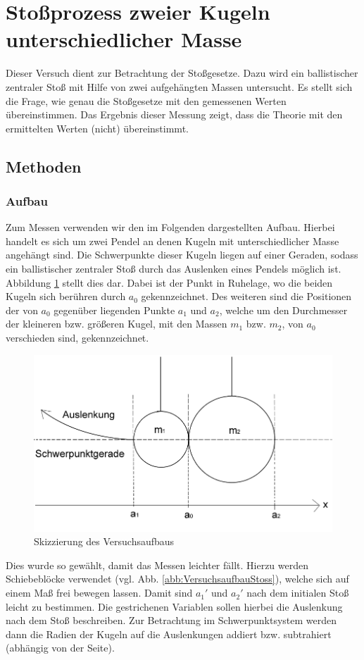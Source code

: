 \section{Stoßprozess zweier Kugeln unterschiedlicher Masse}
	
	Dieser Versuch dient zur Betrachtung der Stoßgesetze. Dazu wird ein ballistischer zentraler Stoß mit Hilfe von zwei aufgehängten Massen untersucht. Es stellt sich die Frage, wie genau die Stoßgesetze mit den gemessenen Werten übereinstimmen. Das Ergebnis dieser Messung zeigt, dass die Theorie mit den ermittelten Werten (nicht) übereinstimmt. %
	
	\subsection{Methoden}
		
		\subsubsection{Aufbau}
			
		Zum Messen verwenden wir den im Folgenden dargestellten Aufbau. Hierbei handelt es sich um zwei Pendel an denen Kugeln mit unterschiedlicher Masse angehängt sind. Die Schwerpunkte dieser Kugeln liegen auf einer Geraden, sodass ein ballistischer zentraler Stoß durch das Auslenken eines Pendels möglich ist. Abbildung \ref{abb:VersuchsskizzeStoss} stellt dies dar. Dabei ist der Punkt in Ruhelage, wo die beiden Kugeln sich berühren durch $a_0$ gekennzeichnet. Des weiteren sind die Positionen der von $a_0$ gegenüber liegenden Punkte $a_1$ und $a_2$, welche um den Durchmesser der kleineren bzw. größeren Kugel, mit den Massen $m_1$ bzw. $m_2$, von $a_0$ verschieden sind, gekennzeichnet.
		\begin{figure}[ht]
			\centering
			\includegraphics[width=\textwidth]{Kugelstoss.png}
			\caption{Skizzierung des Versuchsaufbaus}
			\label{abb:VersuchsskizzeStoss}	
		\end{figure}
		Dies wurde so gewählt, damit das Messen leichter fällt. Hierzu werden Schiebeblöcke verwendet (vgl. Abb. \ref{abb:VersuchsaufbauStoss}), welche sich auf einem Maß frei bewegen lassen. Damit sind $a_1'$ und $a_2'$ nach dem initialen Stoß leicht zu bestimmen. Die gestrichenen Variablen sollen hierbei die Auslenkung nach dem Stoß beschreiben. Zur Betrachtung im Schwerpunktsystem werden dann die Radien der Kugeln auf die Auslenkungen addiert bzw. subtrahiert (abhängig von der Seite). 
		
